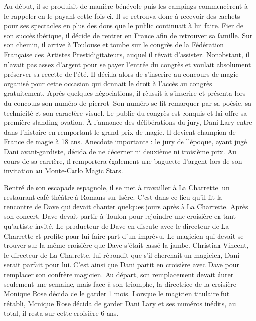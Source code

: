 Au début, il se produisit de manière bénévole puis les campings commencèrent à le rappeler en le payant cette fois-ci. Il se retrouva donc à recevoir des cachets pour ses spectacles en plus des dons que le public continuait à lui faire. Fier de son succès ibérique, il décide de rentrer en France afin de retrouver sa famille. Sur son chemin, il arrive à Toulouse et tombe sur le congrès de la Fédération Française des Artistes Prestidigitateurs, auquel il rêvait d’assister. Nonobstant, il n’avait pas assez d’argent pour se payer l’entrée du congrès et voulait absolument préserver sa recette de l’été. Il décida alors de s’inscrire au concours de magie organisé pour cette occasion qui donnait le droit à l’accès au congrès gratuitement. Après quelques négociations, il réussit à s’inscrire et présenta lors du concours son numéro de pierrot. Son numéro se fit remarquer par sa poésie, sa technicité et son caractère visuel. Le public du congrès est conquis et lui offre sa première standing ovation. À l’annonce des délibérations du jury, Dani Lary entre dans l’histoire en remportant le grand prix de magie. Il devient champion de France de magie à 18 ans. Anecdote importante : le jury de l’époque, ayant jugé Dani avant-gardiste, décida de ne décerner ni deuxième ni troisième prix. Au cours de sa carrière, il remportera également une baguette d’argent lors de son invitation au Monte-Carlo Magic Stars. 

Rentré de son escapade espagnole, il se met à travailler à La Charrette, un restaurant café-théâtre à Romans-sur-Isère. C’est dans ce lieu qu’il fit la rencontre de Dave qui devait chanter quelques jours après à La Charrette. Après son concert, Dave devait partir à Toulon pour rejoindre une croisière en tant qu’artiste invité. Le producteur de Dave en discute avec le directeur de La Charrette et profite pour lui faire part d’un imprévu. Le magicien qui devait se trouver sur la même croisière que Dave s’était cassé la jambe. Christian Vincent, le directeur de La Charrette, lui répondit que s’il cherchait un magicien, Dani serait parfait pour lui. C’est ainsi que Dani partit en croisière avec Dave pour remplacer son confrère magicien. Au départ, son remplacement devait durer seulement une semaine, mais face à son triomphe, la directrice de la croisière Monique Rose décida de le garder 1 mois. Lorsque le magicien titulaire fut rétabli, Monique Rose décida de garder Dani Lary et ses numéros inédits, au total, il resta sur cette croisière 6 ans. 

